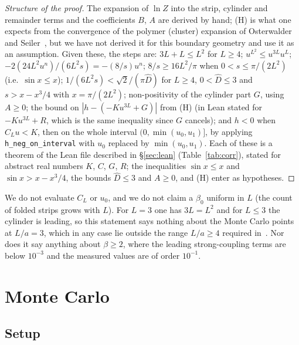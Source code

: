 \documentclass[11pt,a4paper]{article}
\theoremstyle{definition}
\theoremstyle{remark}
\begin{document}
\begin{proof}[Structure of the proof]
The expansion of $\ln Z$ into the strip, cylinder and remainder terms and the coefficients $B$, $A$ are derived by hand; (H) is what one expects from the convergence of the polymer (cluster) expansion of Osterwalder and Seiler~\cite{OS}, but we have not derived it for this boundary geometry and use it as an assumption. Given these, the steps are: $3L+L\le L^2$ for $L\ge4$; $u^{L^2}\le u^{3L}u^L$; $-2(24L^2u^n)/(6L^2s)=-(8/s)u^n$; $8/s\ge16L^2/\pi$ when $0<s\le\pi/(2L^2)$ (i.e.\ $\sin x\le x$); $1/(6L^2s)<\sqrt2/(\pi\hat D)$ for $L\ge4$, $0<\hat D\le3$ and $s>x-x^3/4$ with $x=\pi/(2L^2)$; non-positivity of the cylinder part $G$, using $A\ge0$; the bound on $|h-(-Ku^{3L}+G)|$ from (H) (in Lean stated for $-Ku^{3L}+R$, which is the same inequality since $G$ cancels); and $h<0$ when $C_Lu<K$, then on the whole interval $(0,\min(u_0,u_1)]$, by applying \texttt{h\_neg\_on\_interval} with $u_0$ replaced by $\min(u_0,u_1)$. Each of these is a theorem of the Lean file described in \S\ref{sec:lean} (Table~\ref{tab:corr}), stated for abstract real numbers $K$, $C$, $G$, $R$; the inequalities $\sin x\le x$ and $\sin x>x-x^3/4$, the bounds $\hat D\le3$ and $A\ge0$, and (H) enter as hypotheses.
\end{proof}

We do not evaluate $C_L$ or $u_0$, and we do not claim a $\beta_0$ uniform in $L$ (the count of folded strips grows with $L$). For $L=3$ one has $3L=L^2$ and for $L\le3$ the cylinder is leading, so this statement says nothing about the Monte Carlo points at $L/a=3$, which in any case lie outside the range $L/a\ge4$ required in~\cite[(2.9)]{LSWW}. Nor does it say anything about $\beta\ge2$, where the leading strong-coupling terms are below $10^{-3}$ and the measured values are of order $10^{-1}$.

\section{Monte Carlo}\label{sec:mc}

\subsection{Setup}
\end{document}
